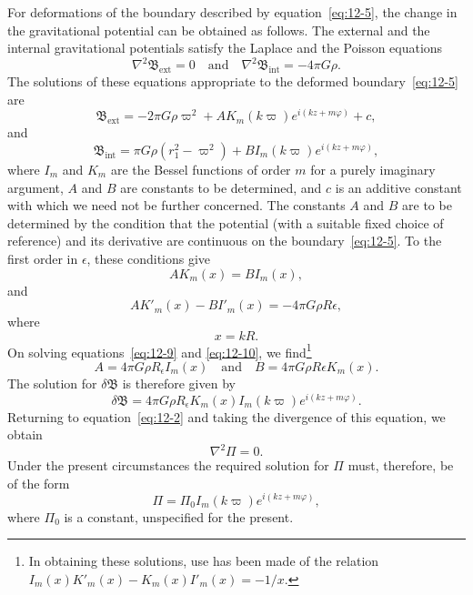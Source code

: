 For deformations of the boundary described by equation~\eqref{eq:12-5}, the change in the gravitational potential can be obtained as follows. The external and the internal gravitational potentials satisfy the Laplace and the Poisson equations
\begin{equation}
\label{eq:12-6}
\nabla^2 \mathfrak{B}_{\mathrm{ext}} = 0 \quad \text{and} \quad \nabla^2 \mathfrak{B}_{\mathrm{int}} = -4\pi G\rho.
\end{equation}
The solutions of these equations appropriate to the deformed boundary~\eqref{eq:12-5} are
\begin{equation}
\label{eq:12-7}
\mathfrak{B}_{\mathrm{ext}} = -2\pi G\rho \varpi^2 + A K_m(k\varpi) e^{i(kz+m\varphi)} + c,
\end{equation}
and
\begin{equation}
\label{eq:12-8}
\mathfrak{B}_{\mathrm{int}} = \pi G\rho(r_1^2 - \varpi^2) + B I_m(k\varpi) e^{i(kz+m\varphi)},
\end{equation}
where $I_m$ and $K_m$ are the Bessel functions of order $m$ for a purely imaginary argument, $A$ and $B$ are constants to be determined, and $c$ is an additive constant with which we need not be further concerned. The constants $A$ and $B$ are to be determined by the condition that the potential (with a suitable fixed choice of reference) and its derivative are continuous on the boundary~\eqref{eq:12-5}. To the first order in $\epsilon$, these conditions give
\begin{equation}
\label{eq:12-9}
A K_m(x) = B I_m(x),
\end{equation}
and
\begin{equation}
\label{eq:12-10}
A K'_m(x) - B I'_m(x) = -4\pi G\rho R \epsilon,
\end{equation}
where
\begin{equation}
\label{eq:12-11}
x = kR.
\end{equation}
On solving equations~\eqref{eq:12-9} and \eqref{eq:12-10}, we find\footnote{In obtaining these solutions, use has been made of the relation $I_m(x) K'_m(x) - K_m(x) I'_m(x) = -1/x$.}
\begin{equation}
\label{eq:12-12}
A = 4\pi G\rho R_\epsilon I_m(x) \quad \text{and} \quad B = 4\pi G\rho R\epsilon K_m(x).
\end{equation}
The solution for $\delta\mathfrak{B}$ is therefore given by
\begin{equation}
\label{eq:12-13}
\delta\mathfrak{B} = 4\pi G\rho R_\epsilon K_m(x) I_m(k\varpi) e^{i(kz+m\varphi)}.
\end{equation}
Returning to equation~\eqref{eq:12-2} and taking the divergence of this equation, we obtain
\begin{equation}
\label{eq:12-14}
\nabla^2 \Pi = 0.
\end{equation}
Under the present circumstances the required solution for $\Pi$ must, therefore, be of the form
\begin{equation}
\label{eq:12-15}
\Pi = \Pi_0 I_m(k\varpi) e^{i(kz+m\varphi)},
\end{equation}
where $\Pi_0$ is a constant, unspecified for the present.

